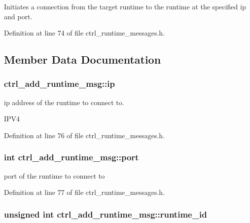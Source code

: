 Initiates a connection from the target runtime to the runtime at the specified ip and port. 

Definition at line 74 of file ctrl\-\_\-runtime\-\_\-messages.\-h.



\subsection{Member Data Documentation}
\hypertarget{structctrl__add__runtime__msg_acc02f0403e49f0b92466de8703a2fc55}{
\subsubsection[{ip}]{ ctrl\-\_\-add\-\_\-runtime\-\_\-msg\-::ip}}\label{structctrl__add__runtime__msg_acc02f0403e49f0b92466de8703a2fc55}


ip address of the runtime to connect to. 

I\-P\-V4 

Definition at line 76 of file ctrl\-\_\-runtime\-\_\-messages.\-h.

\hypertarget{structctrl__add__runtime__msg_a191816d657a91e53fb58ec1d73b2339e}{
\subsubsection[{port}]{\setlength{\rightskip}{0pt plus 5cm}int ctrl\-\_\-add\-\_\-runtime\-\_\-msg\-::port}}\label{structctrl__add__runtime__msg_a191816d657a91e53fb58ec1d73b2339e}


port of the runtime to connect to 



Definition at line 77 of file ctrl\-\_\-runtime\-\_\-messages.\-h.

\hypertarget{structctrl__add__runtime__msg_ad0b16bb9b47592729655a1f597694594}{
\subsubsection[{runtime\-\_\-id}]{\setlength{\rightskip}{0pt plus 5cm}unsigned int ctrl\-\_\-add\-\_\-runtime\-\_\-msg\-::runtime\-\_\-id}}\label{structctrl__add__runtime__msg_ad0b16bb9b47592729655a1f597694594}


